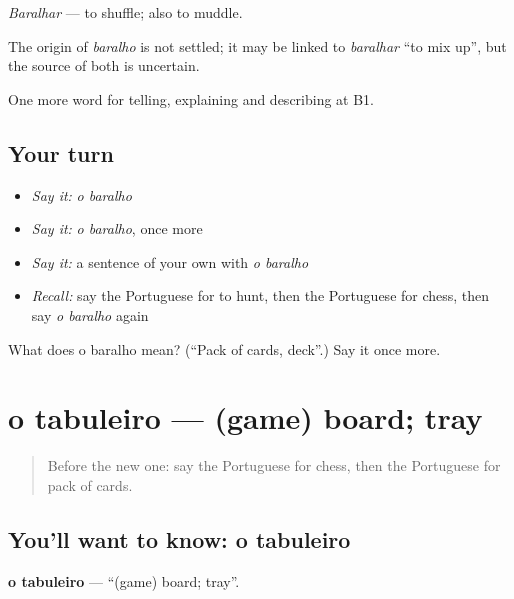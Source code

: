 \emph{Baralhar} — to shuffle; also to muddle.

\begin{cousinweb}
The origin of \emph{baralho} is not settled; it may be linked to \emph{baralhar} \textquotedblleft{}to mix up\textquotedblright{}, but the source of both is uncertain.
\end{cousinweb}

\begin{grammarlens}[title={What you've built}]
One more word for telling, explaining and describing at B1.
\end{grammarlens}

\subsection*{Your turn}
\begin{itemize}
\raggedright
  \item \emph{Say it:} \emph{o baralho}
  \item \emph{Say it:} \emph{o baralho}, once more
  \item \emph{Say it:} a sentence of your own with \emph{o baralho}
  \item \emph{Recall:} say the Portuguese for to hunt, then the Portuguese for chess, then say \emph{o baralho} again
\end{itemize}

\begin{tcolorbox}[breakable,colback=teal!4,colframe=teal!35!black,title={Before you move on}]
What does o baralho mean? (\textquotedblleft{}Pack of cards, deck\textquotedblright{}.) Say it once more.
\end{tcolorbox}
\section[o tabuleiro]{o tabuleiro — (game) board; tray}

\label{lesson:PT-C503-tabuleiro}



\begin{quote}
Before the new one: say the Portuguese for chess, then the Portuguese for pack of cards.
\end{quote}

\subsection*{You'll want to know: o tabuleiro}
\textbf{o tabuleiro} — \textquotedblleft{}(game) board; tray\textquotedblright{}.

